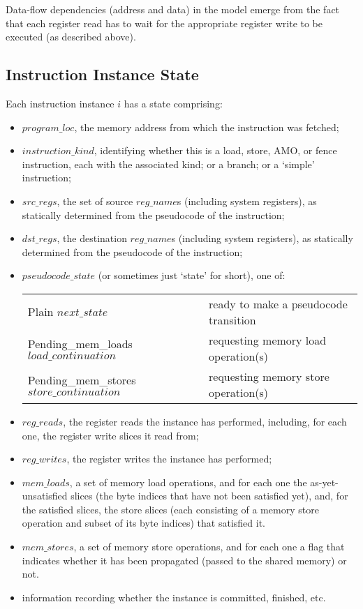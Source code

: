 Data-flow dependencies (address and data) in the model emerge from the
fact that each register read has to wait for the appropriate register write to be executed (as described above).

\subsection{Instruction Instance State}\label{sec:omm:inst_state}
Each instruction instance $i$ has a state comprising:
\begin{itemize}
\item $program\_loc$, the memory address from which the instruction was fetched;
\item $instruction\_kind$, identifying whether this is a load, store, AMO, or fence instruction, each with the associated kind; or a branch; or a `simple' instruction;
\item $src\_regs$, the set of source $reg\_name$s (including system registers), as statically determined from the pseudocode of the instruction;
\item $dst\_regs$, the destination $reg\_name$s (including system registers), as statically determined from the pseudocode of the instruction;
\item $pseudocode\_state$ (or sometimes just `state' for short), one of:
  \begin{center}
  \begin{tabular}{l@{ \quad-\quad }l}
  {\sc Plain} $next\_state$                        & ready to make a pseudocode transition \\
  {\sc Pending\_mem\_loads} $load\_continuation$   & requesting memory load operation(s) \\
  {\sc Pending\_mem\_stores} $store\_continuation$ & requesting memory store operation(s) \\
  \end{tabular}
  \end{center}

\item $reg\_reads$, the register reads the instance has performed, including, for each one, the register write slices it read from;
\item $reg\_writes$, the register writes the instance has performed;
\item $mem\_loads$, a set of memory load operations, and for each one
  the as-yet-unsatisfied slices (the byte indices that have not been
  satisfied yet), and, for the satisfied slices, the store slices
  (each consisting of a memory store operation and subset of its byte indices) that satisfied it.
\item $mem\_stores$, a set of memory store operations, and for each one a flag that indicates whether it has been propagated (passed to the shared memory) or not.
\item information recording whether the instance is committed, finished, etc.
\end{itemize}

